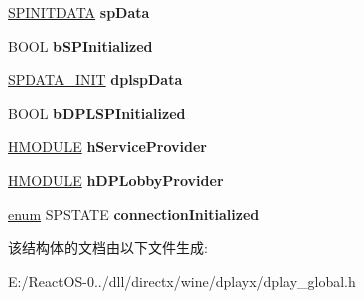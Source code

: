 \begin{DoxyCompactItemize}
\hyperlink{structtag_s_p_i_n_i_t_d_a_t_a}{S\+P\+I\+N\+I\+T\+D\+A\+TA} {\bfseries sp\+Data}
\item 
\mbox{\label{structtag_direct_play2_data_a4df89d528cdc2603b349cfa78901ead8}} 
B\+O\+OL {\bfseries b\+S\+P\+Initialized}
\item 
\mbox{\label{structtag_direct_play2_data_ac5b535532b3ebc72392a66346d48ac57}} 
\hyperlink{struct_s_p_d_a_t_a___i_n_i_t}{S\+P\+D\+A\+T\+A\+\_\+\+I\+N\+IT} {\bfseries dplsp\+Data}
\item 
\mbox{\label{structtag_direct_play2_data_af267a3b1f9588699db303fff1d7c4cd8}} 
B\+O\+OL {\bfseries b\+D\+P\+L\+S\+P\+Initialized}
\item 
\mbox{\label{structtag_direct_play2_data_aeea0dde8cccd0cef0ec4b3cb10530743}} 
\hyperlink{interfacevoid}{H\+M\+O\+D\+U\+LE} {\bfseries h\+Service\+Provider}
\item 
\mbox{\label{structtag_direct_play2_data_a39090b2bf8e936fc7ba0a6efc4a5bf15}} 
\hyperlink{interfacevoid}{H\+M\+O\+D\+U\+LE} {\bfseries h\+D\+P\+Lobby\+Provider}
\item 
\mbox{\label{structtag_direct_play2_data_a9239947a5f0f2134b37df6641b7ccf35}} 
\hyperlink{interfaceenum}{enum} S\+P\+S\+T\+A\+TE {\bfseries connection\+Initialized}
\end{DoxyCompactItemize}


该结构体的文档由以下文件生成\+:\begin{DoxyCompactItemize}
\item 
E\+:/\+React\+O\+S-\/0../dll/directx/wine/dplayx/dplay\+\_\+global.\+h\end{DoxyCompactItemize}
